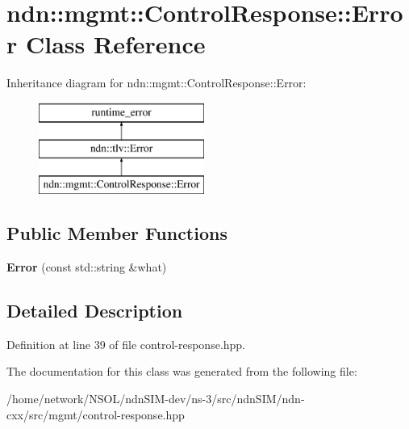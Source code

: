 \hypertarget{classndn_1_1mgmt_1_1ControlResponse_1_1Error}{}\section{ndn\+:\+:mgmt\+:\+:Control\+Response\+:\+:Error Class Reference}
\label{classndn_1_1mgmt_1_1ControlResponse_1_1Error}
Inheritance diagram for ndn\+:\+:mgmt\+:\+:Control\+Response\+:\+:Error\+:\begin{figure}[H]
\begin{center}
\leavevmode
\includegraphics[height=3.000000cm]{classndn_1_1mgmt_1_1ControlResponse_1_1Error}
\end{center}
\end{figure}
\subsection*{Public Member Functions}
\begin{DoxyCompactItemize}
\item 
{\bfseries Error} (const std\+::string \&what)\hypertarget{classndn_1_1mgmt_1_1ControlResponse_1_1Error_a4af6c6ba94c8d3a4e1d00201c34fe1b5}{}\label{classndn_1_1mgmt_1_1ControlResponse_1_1Error_a4af6c6ba94c8d3a4e1d00201c34fe1b5}

\end{DoxyCompactItemize}


\subsection{Detailed Description}


Definition at line 39 of file control-\/response.\+hpp.



The documentation for this class was generated from the following file\+:\begin{DoxyCompactItemize}
\item 
/home/network/\+N\+S\+O\+L/ndn\+S\+I\+M-\/dev/ns-\/3/src/ndn\+S\+I\+M/ndn-\/cxx/src/mgmt/control-\/response.\+hpp\end{DoxyCompactItemize}
